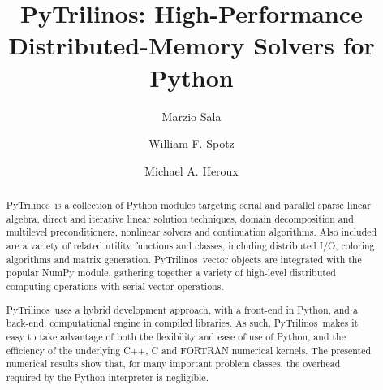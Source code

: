 \documentclass{llncs}
\newcommand{\PyTrilinos}{{\sc PyTrilinos}}
\begin{document}
\pagestyle{headings} 
\mainmatter              %

\title{\PyTrilinos: High-Performance Distributed-Memory Solvers for
       Python}

\author{Marzio Sala \and William F. Spotz \and 
  Michael A. Heroux}

%
%

\maketitle              %

\begin{abstract}
\PyTrilinos\ is a collection of Python modules targeting serial
and parallel sparse linear algebra, direct and iterative linear
solution techniques, domain decomposition and multilevel
preconditioners, nonlinear solvers and continuation algorithms. Also
included are a variety of related utility functions and classes,
including distributed I/O, coloring algorithms and matrix
generation. \PyTrilinos\ vector objects are integrated with the
popular NumPy module, gathering together a variety of
high-level distributed computing operations with serial vector
operations.

\PyTrilinos\ uses a hybrid development approach, with a front-end in Python,
and a back-end, computational engine in compiled libraries. As such,
\PyTrilinos\ makes it easy to
take advantage of both the flexibility and ease of use of Python, and the
efficiency of the underlying C++, C and FORTRAN numerical kernels.  The
presented numerical results show that, for many important problem classes, the
overhead required by the Python interpreter is negligible.
\end{abstract}
\end{document}
